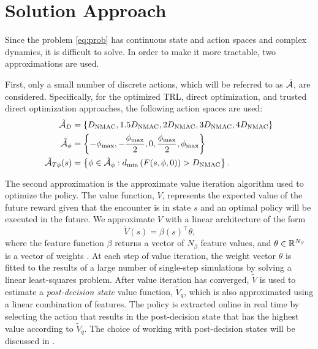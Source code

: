 \section{Solution Approach} \label{sec:approach}

Since the problem \eqref{eq:prob} has continuous state and action spaces and complex dynamics, it is difficult to solve.
In order to make it more tractable, two approximations are used.

First, only a small number of discrete actions, which will be referred to as $\tilde{\mathcal{A}}$, are considered. Specifically, for the optimized TRL, direct optimization, and trusted direct optimization approaches, the following action spaces are used:
\begin{align}
    {\tilde{\ensuremath{\mathcal{A}}}}_{D} &= \{D_\mathrm{NMAC}, \allowbreak 1.5 D_\mathrm{NMAC}, \allowbreak 2 D_\mathrm{NMAC}, \allowbreak 3 D_\mathrm{NMAC}, \allowbreak 4 D_\mathrm{NMAC} \} \\
    {\tilde{\mathcal{A}}}_\phi &= \left\{-\phi_\text{max},-\frac{\phi_\text{max}}{2}, 0, \frac{\phi_\text{max}}{2},\phi_\text{max}\right\} \\
    {\tilde{\mathcal{A}}}_{T\phi}(s) &= \left\{\phi \in {\tilde{\ensuremath{\mathcal{A}}}}_\phi : d_\text{min}\left(F(s, \phi, 0)\right) > D_\text{NMAC} \right\} \text{.}
\end{align}

The second approximation is the approximate value iteration algorithm \cite{DB:05} used to optimize the policy. The value function, $V$, represents the expected value of the future reward given that the encounter is in state $s$ and an optimal policy will be executed in the future. We approximate $V$ with a linear architecture of the form
\begin{equation}\label{eqn:val}
    \tilde{V}(s) = \beta(s)^\top \theta \text{,}
\end{equation}
where the feature function $\beta$ returns a vector of $N_\beta$ feature values, and $\theta\in \mathbb{R}^{N_\beta}$ is a vector of weights \cite{DB:05}. At each step of  value iteration, the weight vector $\theta$ is fitted to the results of a large number of single-step simulations by solving a linear least-squares problem. After value iteration has converged, $\tilde{V}$ is used to estimate a \emph{post-decision state} value function, $\tilde{V}_q$,  which is also approximated using a linear combination of features. The policy is extracted online in real time by selecting the action that results in the post-decision state that has the highest value according to $\tilde{V}_q$. The choice of working with post-decision states will be discussed in .

